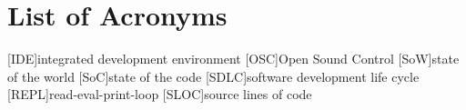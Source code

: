 
\chapter*{List of Acronyms}
\label{chap:acronyms}

\begin{acronym}
[IDE]{integrated development environment}
[OSC]{Open Sound Control}
[SoW]{state of the world}
[SoC]{state of the code}
[SDLC]{software development life cycle}
[REPL]{read-eval-print-loop}
[SLOC]{source lines of code}
\end{acronym}